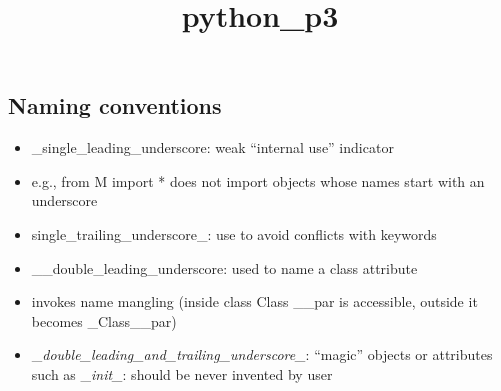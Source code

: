 \documentclass[11pt]{article}
\title{python\_p3}
\providecommand{\tightlist}{%
      \setlength{\itemsep}{0pt}\setlength{\parskip}{0pt}}
\begin{document}
    
    \maketitle
    
    

    
    \hypertarget{naming-conventions}{%
\subsection{Naming conventions}\label{naming-conventions}}

\begin{itemize}
\tightlist
\item
  \_single\_leading\_underscore: weak ``internal use'' indicator
\item
  e.g., from M import * does not import objects whose names start with
  an underscore
\item
  single\_trailing\_underscore\_: use to avoid conflicts with keywords
\item
  \_\_double\_leading\_underscore: used to name a class attribute
\item
  invokes name mangling (inside class Class \_\_par is accessible,
  outside it becomes \_Class\_\_par)
\item
  \_\emph{double\_leading\_and\_trailing\_underscore\_}: ``magic''
  objects or attributes such as \_\emph{init\_}: should be never
  invented by user
\end{itemize}
\end{document}
